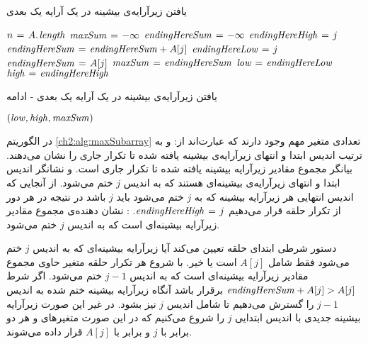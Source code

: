 \begin{algorithm}[H]
\caption{یافتن زیرآرایه‌ی بیشینه‌ در یک آرایه یک بعدی}\label{ch2:alg:maxSubarray}
\begin{latin}
\begin{algorithmic}[1]
	\State	$n\mathrel{\hspace{1pt}=\hspace{1pt}} A.\hspace*{1pt}\mathit{\mathit{length}}$
	\State	$\mathit{maxSum}\mathrel{\hspace{1pt}=\hspace{1pt}} -\infty$
	\State	$\mathit{endingHereSum}\mathrel{\hspace{1pt}=\hspace{1pt}} -\infty$
		\State	$\mathit{endingHereHigh}\mathrel{\hspace{1pt}=\hspace{1pt}} j$
			\State	$\mathit{endingHereSum}\mathrel{\hspace{1pt}=\hspace{1pt}} \mathit{endingHereSum} + A[j]$
		\Else
			\State	$\mathit{endingHereLow}\mathrel{\hspace{1pt}=\hspace{1pt}} j$
			\State	$\mathit{endingHereSum}\mathrel{\hspace{1pt}=\hspace{1pt}} A[j]$
		\EndIf
			\State	$\mathit{maxSum}\mathrel{\hspace{1pt}=\hspace{1pt}} \mathit{endingHereSum}$
			\State	$\mathit{low}\mathrel{\hspace{1pt}=\hspace{1pt}} \mathit{endingHereLow}$
			\State	$\mathit{high}\mathrel{\hspace{1pt}=\hspace{1pt}} \mathit{endingHereHigh}$			
		\EndIf		
		\EndFor		
\end{algorithmic}
\end{latin}
\end{algorithm}

\begin{algorithm}
\caption*{یافتن زیرآرایه‌ی بیشینه‌ در یک آرایه یک بعدی - ادامه}
\begin{latin}
\begin{algorithmic}[1]
	\State	\Return $(\mathit{low},\mathit{high},\mathit{maxSum})$
\EndFunction
\end{algorithmic}
\end{latin}
\end{algorithm}

در الگوریتم {\eqref{ch2:alg:maxSubarray}} تعدادی متغیر مهم وجود دارند که عبارت‌اند از:
 و {} به ترتیب اندیس ابتدا و انتهای زیرآرایه‌ی بیشینه یافته شده تا تکرار جاری را نشان می‌دهند.
 بیانگر مجموع مقادیر زیرآرایه بیشینه یافته شده تا تکرار جاری است.
 و {} نشانگر اندیس ابتدا و انتهای زیرآرایه‌ی بیشینه‌ای هستند که به اندیس {$j$} ختم می‌شود. از آنجایی که اندیس انتهایی هر زیرآرایه بیشینه که به {$j$} ختم می‌شود باید {$j$} باشد در نتیجه در هر دور از تکرار حلقه قرار می‌دهیم {$\mathit{endingHereHigh}\mathrel{\hspace{1pt}=\hspace{1pt}} j$}.
: نشان دهنده‌ی مجموع مقادیر زیرآرایه بیشینه‌ای است که به اندیس {$j$} ختم می‌شود.

دستور شرطی ابتدای حلقه تعیین می‌کند آیا زیرآرایه بیشینه‌ای که به اندیس {$j$} ختم می‌شود فقط شامل {$A[j]$} است یا خیر. با شروع هر تکرار حلقه متغیر {} حاوی مجموع مقادیر زیرآرایه بیشینه‌ای است که به اندیس {$j-1$} ختم می‌شود. اگر شرط {$\mathit{endingHereSum}+A[j]>A[j]$} برقرار باشد آنگاه زیرآرایه بیشینه ختم شده به اندیس {$j-1$} را گسترش می‌دهیم تا شامل اندیس {$j$} نیز بشود. در غیر این صورت زیرآرایه بیشینه جدیدی با اندیس ابتدایی {$j$} را شروع می‌کنیم که در این صورت متغیرهای {} و {} هر دو برابر با {$j$} و {} برابر با {$A[j]$} قرار داده می‌شوند.

